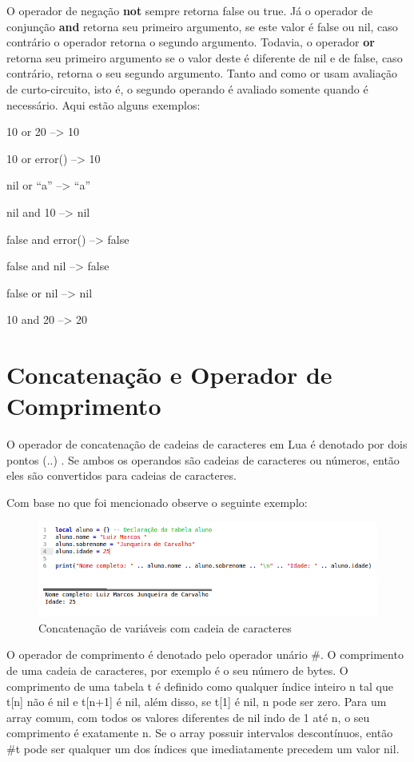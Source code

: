 \documentclass[
12pt, %
openright, %
oneside, %
a4paper, %
english, %
brazil, %
]{abntex2}
\begin{document}
O operador de negação \textbf{not} sempre retorna false ou true. Já o operador de conjunção \textbf{and} retorna seu primeiro argumento, se este valor é false ou nil, caso contrário o operador retorna o segundo argumento. Todavia, o operador \textbf{or} retorna seu primeiro argumento se o valor deste é diferente de nil e de false, caso contrário, retorna o seu segundo argumento. Tanto and como or usam avaliação de curto-circuito, isto é, o segundo operando é avaliado somente quando é necessário. Aqui estão alguns exemplos:

10 or 20            --> 10

10 or error()       --> 10

nil or ``a''        --> ``a''

nil and 10          --> nil

false and error()   --> false

false and nil       --> false

false or nil        --> nil

10 and 20           --> 20

\section{Concatenação e Operador de Comprimento}
O operador de concatenação de cadeias de caracteres em Lua é denotado por dois pontos (..) . Se ambos os operandos são cadeias de caracteres ou números, então eles são convertidos para cadeias de caracteres.

Com base no que foi mencionado observe o seguinte exemplo:

\begin{figure}[H]
\centering
\includegraphics[width=1\linewidth]{imagens/concatenacao.png}
\caption{Concatenação de variáveis com cadeia de caracteres}
\end{figure}

O operador de comprimento é denotado pelo operador unário \#. O comprimento de uma cadeia de caracteres, por exemplo é o seu número de bytes. O comprimento de uma tabela t é definido como qualquer índice inteiro n tal que t[n] não é nil e t[n+1] é nil, além disso, se t[1] é nil, n pode ser zero. Para um array comum, com todos os valores diferentes de nil indo de 1 até n, o seu comprimento é exatamente n. Se o array possuir intervalos descontínuos, então \#t pode ser qualquer um dos índices que imediatamente precedem um valor nil.
\end{document}
